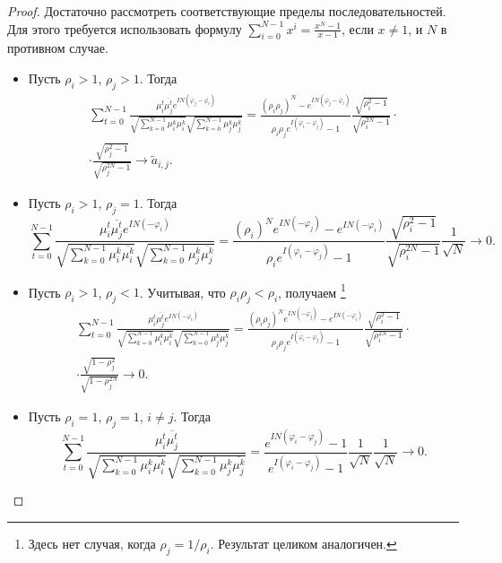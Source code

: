 \documentclass[12pt,a4paper]{article}
\begin{document}
	\begin{proof}
		Достаточно рассмотреть соответствующие пределы последовательностей. Для этого требуется использовать формулу $\sum_{i = 0}^{N-1} x^i = \frac{x^N-1}{x-1}$, если $x \ne 1$, и $N$ в противном случае.
		\begin{itemize}
			\item Пусть $\rho_i > 1$, $\rho_j > 1$. Тогда
			\begin{multline*}
			\sum_{t=0}^{N-1} \frac{\mu_i^t \overline{\mu_j^t} e^{I N (\varphi_j - \varphi_i)}}{\sqrt{\sum_{k=0}^{N-1} \mu_i^k \overline{\mu_i^k}} \sqrt{\sum_{k=0}^{N-1} \mu_j^k \overline{\mu_j^k}}} = \frac{(\rho_i \rho_j)^N - e^{I N(\varphi_j - \varphi_i)}}{\rho_i \rho_j e^{I (\varphi_i - \varphi_j)} - 1} \frac{\sqrt{\rho_i^2 - 1}}{\sqrt{\rho_i^{2N} - 1}} \cdot \\ \cdot \frac{\sqrt{\rho_j^2 - 1}}{\sqrt{\rho_j^{2N} - 1}} \to \tilde a_{i, j}.
			\end{multline*}
			
			\item Пусть $\rho_i > 1$, $\rho_j = 1$. Тогда
			\begin{equation*}
			\sum_{t=0}^{N-1} \frac{\mu_i^t \overline{\mu_j^t} e^{I N (- \varphi_i)}}{\sqrt{\sum_{k=0}^{N-1} \mu_i^k \overline{\mu_i^k}} \sqrt{\sum_{k=0}^{N-1} \mu_j^k \overline{\mu_j^k}}} = \frac{(\rho_i )^N e^{I N ( -\varphi_j)} - e^{I N(-\varphi_i)}}{\rho_i e^{I (\varphi_i - \varphi_j)} - 1} \frac{\sqrt{\rho_i^2 - 1}}{\sqrt{\rho_i^{2N} - 1}} \frac{1}{\sqrt{N}} \to 0.
			\end{equation*}
			
			\item Пусть $\rho_i > 1$, $\rho_j < 1$. Учитывая, что $\rho_i \rho_j < \rho_i$, получаем \footnote{Здесь нет случая, когда $\rho_j = 1/\rho_i$. Результат целиком аналогичен.}
			\begin{multline*}
			\sum_{t=0}^{N-1} \frac{\mu_i^t \overline{\mu_j^t} e^{I N ( - \varphi_i)}}{\sqrt{\sum_{k=0}^{N-1} \mu_i^k \overline{\mu_i^k}} \sqrt{\sum_{k=0}^{N-1} \mu_j^k \overline{\mu_j^k}}} = \frac{(\rho_i \rho_j)^N e^{I N ( -\varphi_j)} - e^{I N( - \varphi_i)}}{\rho_i \rho_j e^{I (\varphi_i - \varphi_j)} - 1} \frac{\sqrt{\rho_i^2 - 1}}{\sqrt{\rho_i^{2N} - 1}} \cdot \\ \cdot \frac{\sqrt{1 - \rho_j^2}}{\sqrt{1 - \rho_j^{2N}}} \to 0.
			\end{multline*}
			
			\item Пусть $\rho_i = 1$, $\rho_j = 1$, $i \ne j$. Тогда
			\begin{equation*}
			\sum_{t=0}^{N-1} \frac{\mu_i^t \overline{\mu_j^t}}{\sqrt{\sum_{k=0}^{N-1} \mu_i^k \overline{\mu_i^k}} \sqrt{\sum_{k=0}^{N-1} \mu_j^k \overline{\mu_j^k}}} = \frac{e^{I N (\varphi_i -\varphi_j)} - 1}{e^{I (\varphi_i - \varphi_j)} - 1} \frac{1}{\sqrt{N}} \frac{1}{\sqrt{N}} \to 0.
			\end{equation*}
			

\end{itemize}
\end{proof}
\end{document}
